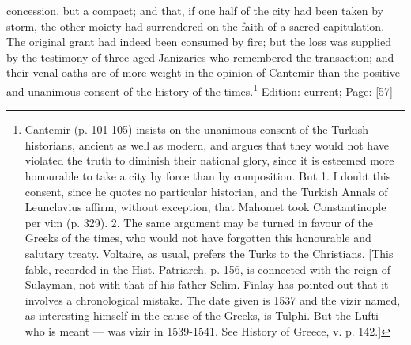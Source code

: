 concession, but a compact; and that, if one half of the city had been taken by storm, the other moiety had surrendered on the faith of a sacred capitulation. The original grant had indeed been consumed by fire; but the loss was supplied by the testimony of three aged Janizaries who remembered the transaction; and their venal oaths are of more weight in the opinion of Cantemir than the positive and unanimous consent of the history of the times.\footnote{Cantemir (p. 101-105) insists on the unanimous consent of the Turkish historians, ancient as well as modern, and argues that they would not have violated the truth to diminish their national glory, since it is esteemed more honourable to take a city by force than by composition. But 1. I doubt this consent, since he quotes no particular historian, and the Turkish Annals of Leunclavius affirm, without exception, that Mahomet took Constantinople per vim (p. 329). 2. The same argument may be turned in favour of the Greeks of the times, who would not have forgotten this honourable and salutary treaty. Voltaire, as usual, prefers the Turks to the Christians. [This fable, recorded in the Hist. Patriarch. p. 156, is connected with the reign of Sulayman, not with that of his father Selim. Finlay has pointed out that it involves a chronological mistake. The date given is 1537 and the vizir named, as interesting himself in the cause of the Greeks, is Tulphi. But the Lufti \texthebrew{—} who is meant \texthebrew{—} was vizir in 1539-1541. See History of Greece, v. p. 142.]}
Edition: current; Page: [57]

